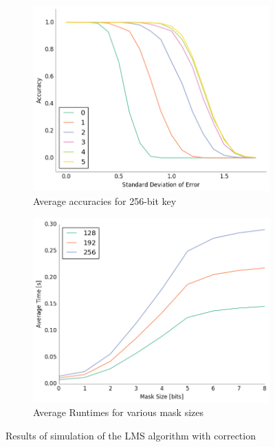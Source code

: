 \documentclass{project-logbook}
\begin{document}
{\begin{figure}[htp]
    \vspace{1cm}
    \begin{subfigure}{0.48\textwidth}
        \centering
        \includegraphics[width=\textwidth]{figures/accuracy_256.png}
        \caption{Average accuracies for 256-bit key}
    \end{subfigure}
    \hspace{.35cm}
    \begin{subfigure}{0.48\textwidth}
        \centering
        \includegraphics[width=\textwidth]{figures/times.png}
        \caption{Average Runtimes for various mask sizes}
    \end{subfigure}
    \vspace{.25cm}
    \caption{Results of simulation of the LMS algorithm with correction}
    \label{fig:plots}
\end{figure}

}
\end{document}
